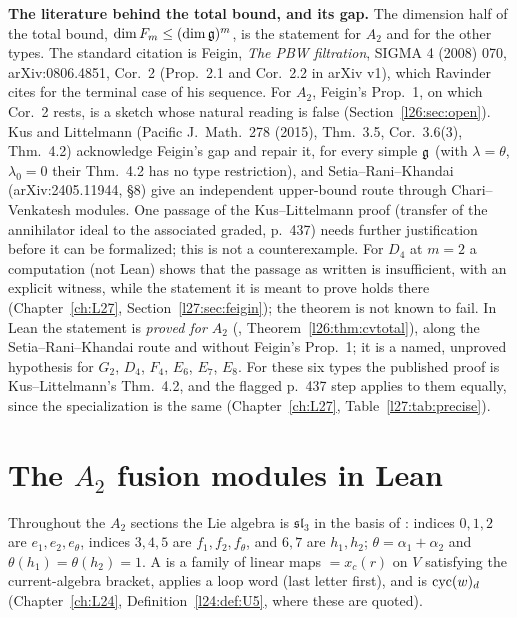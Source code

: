 \begin{warning}
\textbf{The literature behind the total bound, and its gap.} The dimension half of the total bound,
$\dim F_m\le(\dim\mathfrak g)^m$, is the statement  for $A_2$ and  for the other
types. The
standard citation is Feigin, \emph{The PBW filtration}, SIGMA 4 (2008) 070, arXiv:0806.4851, Cor.~2 (Prop.~2.1 and Cor.~2.2 in arXiv v1),
which Ravinder cites for the terminal case of his sequence. For $A_2$, Feigin's Prop.~1, on which Cor.~2 rests, is a sketch whose natural
reading is false (Section~\ref{l26:sec:open}). Kus and Littelmann (Pacific J.\ Math.\ 278 (2015), Thm.~3.5, Cor.~3.6(3), Thm.~4.2)
acknowledge Feigin's gap and repair it, for every simple $\mathfrak g$ (with $\lambda=\theta$, $\lambda_0=0$ their Thm.~4.2 has no type
restriction), and Setia--Rani--Khandai (arXiv:2405.11944, \S8) give an independent upper-bound route through
Chari--Venkatesh modules. One passage of the Kus--Littelmann proof (transfer of the annihilator ideal to the associated graded, p.~437) needs
further justification before it can be formalized; this is not a counterexample. For $D_4$ at $m=2$ a computation (not Lean) shows
that the passage as written is insufficient, with an explicit witness, while the statement it is meant to prove holds there
(Chapter~\ref{ch:L27}, Section~\ref{l27:sec:feigin}); the theorem is not known to fail. In Lean the statement is \emph{proved for
$A_2$} (, Theorem~\ref{l26:thm:cvtotal}), along the Setia--Rani--Khandai route and without Feigin's
Prop.~1; it is a named, unproved hypothesis for $G_2$, $D_4$, $F_4$, $E_6$, $E_7$, $E_8$. For these six types the published
proof is Kus--Littelmann's Thm.~4.2, and the flagged p.~437 step applies to them equally, since the specialization is the same
(Chapter~\ref{ch:L27}, Table~\ref{l27:tab:precise}).
\end{warning}

\section{The $A_2$ fusion modules in Lean}\label{l26:sec:a2rel}

Throughout the $A_2$ sections the Lie algebra is $\mathfrak{sl}_3$ in the basis of :
indices $0,1,2$ are $e_1,e_2,e_\theta$, indices $3,4,5$ are $f_1,f_2,f_\theta$, and $6,7$ are $h_1,h_2$; $\theta=\alpha_1+\alpha_2$
and $\theta(h_1)=\theta(h_2)=1$. A  is a family of linear maps
$=x_c(r)$ on $V$ satisfying the current-algebra bracket,  applies a loop word
(last letter first), and  is $\operatorname{cyc}(w)_d$ (Chapter~\ref{ch:L24},
Definition~\ref{l24:def:U5}, where these are quoted).

